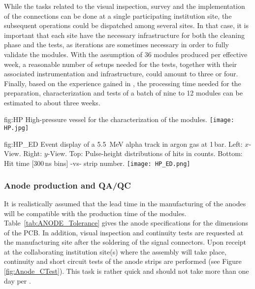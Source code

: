 While the tasks related to the  visual inspection, survey and the implementation of the   connections can be done at 
a single participating institution %
site, the subsequent operations could be dispatched among several sites. In that case, it is  important that each %
site %
have the necessary infrastructure for 
both the cleaning phase and the  tests, as iterations are sometimes necessary in order to fully validate the 
 modules. With the assumption of \num{36}  modules produced per effective week, a reasonable number of setups needed for the   tests, together with their associated instrumentation and infrastructure, could amount to three or four. Finally, based on the experience gained in  , the processing time needed for the preparation, characterization and tests of a batch of nine to \num{12}  modules can be estimated to about three weeks.  

\begin{dunefigure}
{fig:HP} 
{High-pressure vessel for the characterization of the    modules.}
  \texttt{[image: HP.jpg]}
\end{dunefigure}


\begin{dunefigure}
{fig:HP_ED}
{Event display of a \SI{5.5}{MeV} alpha track in argon gas at \num{1}\,bar.  Left: $x$-View. Right: $y$-View. Top: Pulse-height distributions of hits in  counts. Bottom: Hit time [300\,ns bins] -vs- strip number.}
\texttt{[image: HP\_ED.png]}
\end{dunefigure}

\subsubsection{Anode production and QA/QC}
\label{sec:fddp-crp-ANODEprod}
It is realistically assumed that the lead time in the manufacturing of the anodes will be compatible with the production time
of the  modules. Table~\ref{tab:ANODE_Tolerance} gives the anode specifications for the dimensions of the PCB. In addition, visual inspection and continuity tests are requested at the manufacturing site after the soldering of the signal connectors. Upon receipt at the collaborating institution site(s) where the  assembly will take place, continuity and short circuit tests of the anode strips are performed (see Figure \ref{fig:Anode_CTest}). This task is rather quick and should not take more than one day per .  


